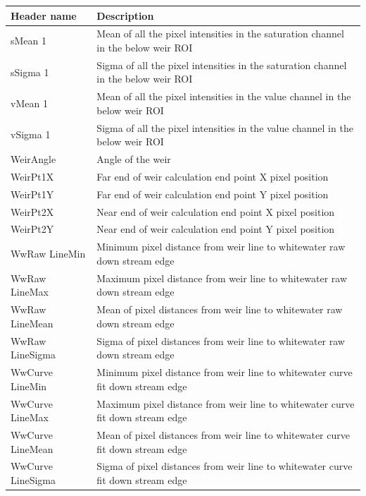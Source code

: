 \documentclass[conference]{IEEEtran}
\begin{document}
\begin{table}[H]
\begin{center}
\begin{tabular}{|m{5em}|m{17em}|} 
 \hline
 \textbf{Header name} & \textbf{Description} \\ 
 \hline
 sMean 1 & Mean of all the pixel intensities in the saturation channel in the below weir ROI \\
 \hline
 sSigma 1 & Sigma of all the pixel intensities in the saturation channel in the below weir ROI \\
 \hline
 vMean 1 & Mean of all the pixel intensities in the value channel in the below weir ROI \\
 \hline
 vSigma 1 & Sigma of all the pixel intensities in the value channel in the below weir ROI \\
 \hline
 WeirAngle & Angle of the weir \\
 \hline
 WeirPt1X & Far end of weir calculation end point X pixel position \\
 \hline
 WeirPt1Y & Far end of weir calculation end point Y pixel position \\
 \hline
 WeirPt2X & Near end of weir calculation end point X pixel position \\
 \hline
 WeirPt2Y & Near end of weir calculation end point Y pixel position \\
 \hline
 WwRaw LineMin & Minimum pixel distance from weir line to whitewater raw down stream edge \\
 \hline
 WwRaw LineMax & Maximum pixel distance from weir line to whitewater raw down stream edge \\
 \hline
 WwRaw LineMean & Mean of pixel distances from weir line to whitewater raw down stream edge \\
 \hline
 WwRaw LineSigma & Sigma of pixel distances from weir line to whitewater raw down stream edge \\
 \hline
 WwCurve LineMin & Minimum pixel distance from weir line to whitewater curve fit down stream edge \\
 \hline
 WwCurve LineMax & Maximum pixel distance from weir line to whitewater curve fit down stream edge \\
 \hline
 WwCurve LineMean & Mean of pixel distances from weir line to whitewater curve fit down stream edge \\
 \hline
 WwCurve LineSigma & Sigma of pixel distances from weir line to whitewater curve fit down stream edge \\
 \hline
\end{tabular}
\end{center}
\end{table}

\newpage
\onecolumn



\newpage
\twocolumn
\printbibliography
\end{document}
